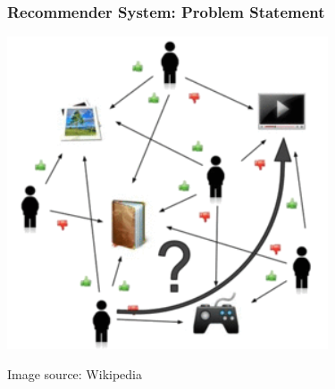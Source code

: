 \documentclass[11pt]{beamer}
\begin{document}
	\begin{frame}
		\frametitle{Recommender System: Problem Statement}
		\begin{center}
			\centering
			\includegraphics[height=0.7\textheight]{images/cf-stage1.png}
			
			{\tiny Image source: Wikipedia}
		\end{center}
	\end{frame}
	
\end{document}

